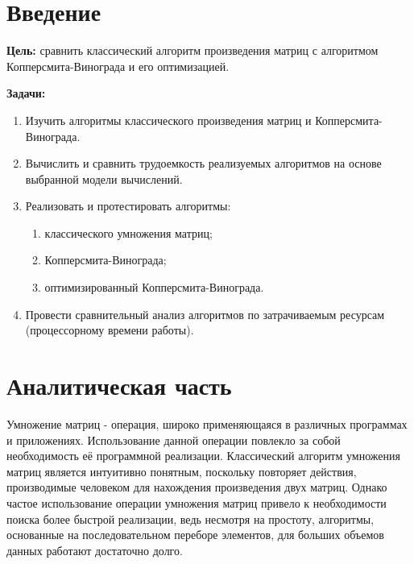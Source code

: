 \documentclass[a4paper,oneside,14pt]{extreport}
\begin{document}

\newpage
\tableofcontents
{}

\newpage

\chapter*{Введение}
\textbf{Цель:} сравнить классический алгоритм произведения матриц с алгоритмом Копперсмита-Винограда и его оптимизацией.

\textbf{Задачи:}
\begin{enumerate}
	\item Изучить алгоритмы классического произведения матриц и Копперсмита-Винограда.
	\item Вычислить и сравнить трудоемкость реализуемых алгоритмов на основе выбранной модели вычислений.
	\item Реализовать и протестировать алгоритмы:
	\begin{enumerate}
		\item классического умножения матриц;
		\item Копперсмита-Винограда;
		\item оптимизированный Копперсмита-Винограда.
	\end{enumerate}
	\item Провести сравнительный анализ алгоритмов по затрачиваемым ресурсам (процессорному времени работы).
\end{enumerate}
\newpage

\chapter{Аналитическая часть}
Умножение матриц - операция, широко применяющаяся в различных программах и приложениях. Использование данной операции повлекло за собой необходимость её программной реализации. Классический алгоритм умножения матриц является интуитивно понятным, поскольку повторяет действия, производимые человеком для нахождения произведения двух матриц. Однако частое использование операции умножения матриц привело к необходимости поиска более быстрой реализации, ведь несмотря на простоту, алгоритмы, основанные на последовательном переборе элементов, для больших объемов данных работают достаточно долго.
\end{document}
